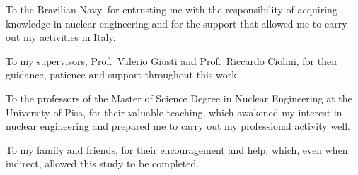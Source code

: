 \documentclass[12pt,twoside,openright]{book}
\begin{document}
To the Brazilian Navy, for entrusting me with the responsibility of
acquiring knowledge in nuclear engineering and for the support that allowed
me to carry out my activities in Italy.

To my supervisors, Prof.~Valerio Giusti and Prof.~Riccardo Ciolini, for
their guidance, patience and support throughout this work.

To the professors of the Master of Science Degree in Nuclear Engineering at
the University of Pisa, for their valuable teaching, which awakened my
interest in nuclear engineering and prepared me to carry out my
professional activity well.

To my family and friends, for their encouragement and help, which, even
when indirect, allowed this study to be completed.

\tableofcontents
\thispagestyle{specialheader}
\markboth{}{}

\listoffigures
\thispagestyle{specialheader}
\markboth{}{}

\listoftables
\thispagestyle{specialheader}
\markboth{}{}

\mainmatter













\begin{appendices}





\end{appendices}

\backmatter
{}


\end{document}

